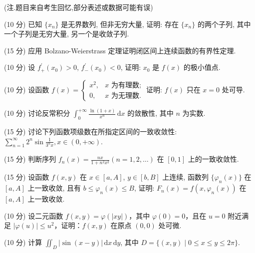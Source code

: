 (注.题目来自考生回忆,部分表述或数据可能有误)\par
(10 分) 已知 $\{x_{n}\}$ 是无界数列, 但非无穷大量, 证明: 存在 $\{x_{n}\}$ 的两个子列, 其中一个子列是无穷大量, 另一个是收敛子列.\par
(15 分) 应用 Bolzano-Weierstrass 定理证明闭区间上连续函数的有界性定理.\par
(10 分) 设 $f_{+}^{\prime}(x_0) > 0$, $f_{-}^{\prime}(x_0) < 0$, 证明: $x_0$ 是 $f(x)$ 的极小值点.\par
(10 分) 设函数 $f(x) = \begin{cases} x^2, & x \text{ 为有理数;} \\ 0, & x \text{ 为无理数.} \end{cases}$ 证明: $f(x)$ 只在 $x = 0$ 处可导.\par
(10 分) 讨论反常积分 $\int_{0}^{+\infty} \frac{\ln(1 + x)}{x^n} \, \mathrm{d}x$ 的敛散性, 其中 $n$ 为实数.\par
(15 分) 讨论下列函数项级数在所指定区间的一致收敛性: $\sum_{n=1}^{\infty} 2^{n} \sin \frac{1}{3^{n} x}, x \in (0, +\infty)$.\par
(15 分) 判断序列 $f_{n}(x) = \frac{nx}{1 + n^{2}x^{2}} (n = 1,2,\dots)$ 在 $[0,1]$ 上的一致收敛性.\par
(15 分) 设函数 $f(x, y)$ 在 $x \in [a, A]$, $y \in [b, B]$ 上连续, 函数列 $\{\varphi_n(x)\}$ 在 $[a, A]$ 上一致收敛, 且有 $b \leq \varphi_n(x) \leq B$, 证明: $F_n(x) = f(x, \varphi_n(x))$ 在 $[a, A]$ 上一致收敛.\par
(10 分) 设二元函数 $f(x, y) = \varphi(|xy|)$，其中 $\varphi(0) = 0$，且在 $u = 0$ 附近满足 $|\varphi(u)| \leq u^2$，证明：$f(x, y)$ 在原点 $(0, 0)$ 处可微.\par
(10 分) 计算 $\iint_{D} |\sin(x - y)| \, \mathrm{d}x \, \mathrm{d}y$, 其中 $D = \{(x, y) \mid 0 \leq x \leq y \leq 2\pi\}$.\par

